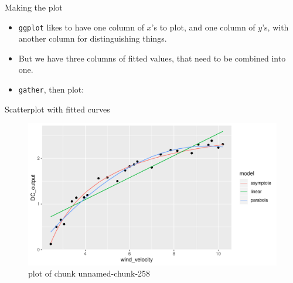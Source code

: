 \documentclass[ignorenonframetext,]{beamer}
\newenvironment{Shaded}{\begin{snugshade}}{\end{snugshade}}
\newcommand{\DataTypeTok}[1]{\textcolor[rgb]{0.13,0.29,0.53}{#1}}
\newcommand{\KeywordTok}[1]{\textcolor[rgb]{0.13,0.29,0.53}{\textbf{#1}}}
\newcommand{\NormalTok}[1]{#1}
\newcommand{\OperatorTok}[1]{\textcolor[rgb]{0.81,0.36,0.00}{\textbf{#1}}}
\newcommand{\StringTok}[1]{\textcolor[rgb]{0.31,0.60,0.02}{#1}}
\providecommand{\tightlist}{%
  \setlength{\itemsep}{0pt}\setlength{\parskip}{0pt}}
\begin{document}
\begin{frame}[fragile]{Making the plot}
\protect\hypertarget{making-the-plot}{}

\begin{itemize}
\tightlist
\item
  \texttt{ggplot} likes to have one column of \(x\)'s to plot, and one
  column of \(y\)'s, with another column for distinguishing things.
\item
  But we have three columns of fitted values, that need to be combined
  into one.
\item
  \texttt{gather}, then plot:
\end{itemize}

\begin{Shaded}
\end{Shaded}

\end{frame}

\begin{frame}{Scatterplot with fitted curves}
\protect\hypertarget{scatterplot-with-fitted-curves}{}

\begin{figure}
\centering
\includegraphics{figure/unnamed-chunk-258-1.pdf}
\caption{plot of chunk unnamed-chunk-258}
\end{figure}

\end{frame}
\end{document}

